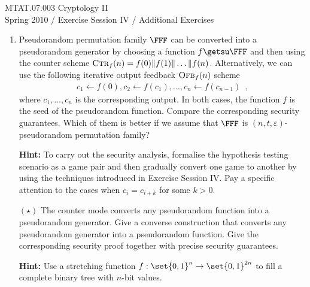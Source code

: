 \documentclass{article}
\begin{document}
\noindent	
MTAT.07.003 Cryptology II\\
Spring 2010 / Exercise Session IV / Additional Exercises 

\begin{enumerate}

\item Pseudorandom permutation family $\FFF$ can be converted into a
  pseudorandom generator by choosing a function $f\getsu \FFF$ and
  then using the counter scheme
  $\textsc{Ctr}_f(n)=f(0)\|f(1)\|\ldots\|f(n)$. Alternatively, we can
  use the following iterative output feedback $\textsc{Ofb}_f(n)$
  scheme
  \begin{align*}
    c_1\gets f(0),c_2\gets f(c_1),\ldots, c_n\gets f(c_{n-1})\enspace,
  \end{align*}
  where $c_1,\ldots,c_n$ is the corresponding output. In both cases,
  the function $f$ is the seed of the pseudorandom function.  Compare
  the corresponding security guarantees. Which of them is better if we
  assume that $\FFF$ is $(n,t,\varepsilon)$-pseudorandom permutation
  family?

  \textbf{Hint:} To carry out the security analysis, formalise the
  hypothesis testing scenario as a game pair and then gradually
  convert one game to another by using the techniques introduced in
  Exercise Session IV.  Pay a specific attention to the cases when
  $c_i=c_{i+k}$ for some $k>0$.



\item [$(\star)$] The counter mode converts any pseudorandom function
  into a pseudorandom generator. Give a converse construction that
  converts any pseudorandom generator into a pseudorandom
  function. Give the corresponding security proof together with
  precise security guarantees.

  \textbf{Hint:} Use a stretching function
  $f:\set{0,1}^n\to\set{0,1}^{2n}$ to fill a complete binary tree with
  $n$-bit values.






\end{enumerate}
\end{document}
